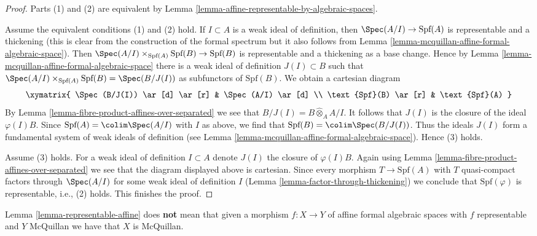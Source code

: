 \begin{proof}
Parts (1) and (2) are equivalent by
Lemma \ref{lemma-affine-representable-by-algebraic-spaces}.

\medskip\noindent
Assume the equivalent conditions (1) and (2) hold.
If $I \subset A$ is a weak ideal of definition, then
$\Spec(A/I) \to \text{Spf}(A)$ is representable and a thickening
(this is clear from the construction of the formal spectrum
but it also follows from
Lemma \ref{lemma-mcquillan-affine-formal-algebraic-space}).
Then $\Spec(A/I) \times_{\text{Spf}(A)} \text{Spf}(B) \to \text{Spf}(B)$
is representable and a thickening as a base change.
Hence by
Lemma \ref{lemma-mcquillan-affine-formal-algebraic-space}
there is a weak ideal of definition $J(I) \subset B$ such that
$\Spec(A/I) \times_{\text{Spf}(A)} \text{Spf}(B) = \Spec(B/J(I))$
as subfunctors of $\text{Spf}(B)$. We obtain a cartesian diagram
$$
\xymatrix{
\Spec(B/J(I)) \ar[d] \ar[r] & \Spec(A/I) \ar[d] \\
\text{Spf}(B) \ar[r] & \text{Spf}(A)
}
$$
By Lemma \ref{lemma-fibre-product-affines-over-separated}
we see that $B/J(I) = B \widehat\otimes_A A/I$.
It follows that $J(I)$ is the closure of the ideal $\varphi(I)B$.
Since $\text{Spf}(A) = \colim \Spec(A/I)$ with $I$ as above,
we find that $\text{Spf}(B) = \colim \Spec(B/J(I))$.
Thus the ideals $J(I)$ form a fundamental system of weak
ideals of definition (see
Lemma \ref{lemma-mcquillan-affine-formal-algebraic-space}).
Hence (3) holds.

\medskip\noindent
Assume (3) holds. For a weak ideal of definition $I \subset A$ denote
$J(I)$ the closure of $\varphi(I)B$. Again using
Lemma \ref{lemma-fibre-product-affines-over-separated}
we see that the diagram displayed above is cartesian. Since
every morphism $T \to \text{Spf}(A)$ with $T$ quasi-compact
factors through $\Spec(A/I)$ for some weak ideal of definition $I$
(Lemma \ref{lemma-factor-through-thickening})
we conclude that $\text{Spf}(\varphi)$ is representable, i.e.,
(2) holds. This finishes the proof.
\end{proof}

\begin{remark}[Warning]
\label{remark-warning}
Lemma \ref{lemma-representable-affine} does {\bf not} mean that given a
morphism $f : X \to Y$ of affine formal algebraic spaces with $f$
representable and $Y$ McQuillan we have that $X$ is McQuillan.
\end{remark}





